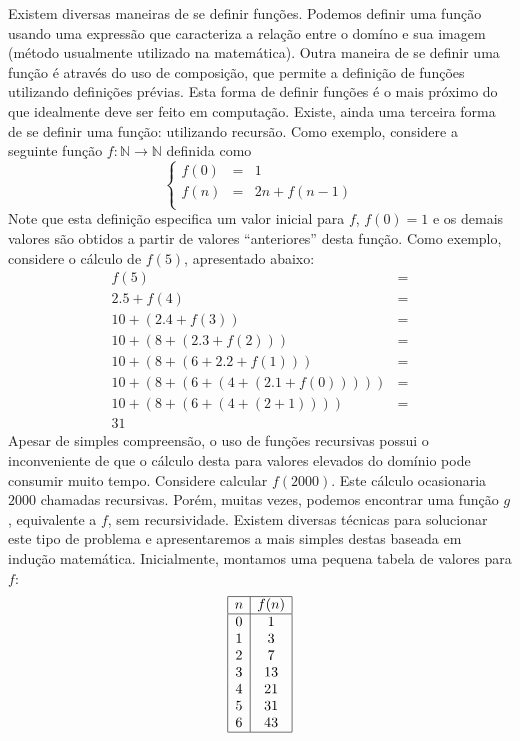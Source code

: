 Existem diversas maneiras de se definir funções. Podemos definir uma
função usando uma expressão que caracteriza a relação entre o domíno e
sua imagem (método usualmente utilizado na matemática). Outra maneira
de se definir uma função é através do uso de composição, que permite a
definição de funções utilizando definições prévias. Esta forma de
definir funções é o mais próximo do que idealmente deve ser feito em
computação. Existe, ainda uma terceira forma de se definir uma função:
utilizando recursão. Como exemplo,
considere a seguinte função $f : \mathbb{N} \to \mathbb{N}$ definida
como
\[
\left\{
\begin{array}{lcl}
  f(0) & = & 1 \\
  f(n) & = & 2n + f(n - 1)\\
\end{array}
\right .
\]
Note que esta definição especifica um valor inicial para $f$, $f(0) =
1$ e os demais valores são obtidos a partir de valores ``anteriores''
desta função. Como exemplo, considere o cálculo de $f(5)$, apresentado
abaixo:
\[
\begin{array}{lc}
f(5) & = \\
2.5 + f(4) & = \\
10 + (2.4 + f(3)) & = \\
10 + (8 + (2.3 + f(2))) & = \\
 10 + (8 + (6 + 2.2 + f(1))) & = \\
10 + (8 + (6 + (4 + (2.1 + f(0))))) & = \\
10 + (8 + (6 + (4 + (2 + 1)))) & = \\
31
\end{array}
\]
Apesar de simples compreensão, o uso de funções recursivas possui o
inconveniente de que o cálculo desta para valores elevados do domínio
pode consumir muito tempo. Considere calcular $f(2000)$. Este cálculo
ocasionaria $2000$ chamadas recursivas. Porém, muitas vezes, podemos
encontrar uma função $g$, equivalente a $f$, sem
recursividade. Existem diversas técnicas para solucionar este tipo de
problema e apresentaremos a mais simples destas baseada em indução matemática.
Inicialmente, montamos uma pequena tabela de valores para $f$:
\[
\begin{array}{|c|c|}
  \hline
  n & f(n) \\ \hline
  0 &  1 \\
  1 &  3 \\
  2 &  7 \\
  3 & 13 \\
  4 & 21 \\
  5 & 31 \\
  6 & 43 \\ \hline
\end{array}
\]
